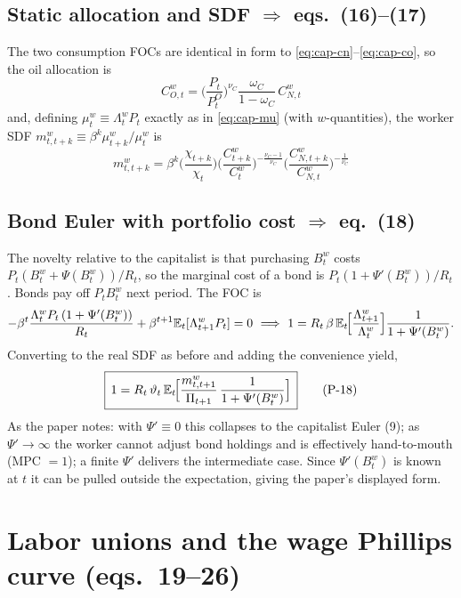 \subsection{Static allocation and SDF \texorpdfstring{$\Rightarrow$}{=>} eqs.\ (16)--(17)}
The two consumption FOCs are identical in form to \eqref{eq:cap-cn}--\eqref{eq:cap-co}, so the oil
allocation is
\begin{equation}\label{eq:17}
\boxed{\,C^w_{O,t}=\Big(\frac{P_t}{P^O_t}\Big)^{\nu_C}\frac{\omega_C}{1-\omega_C}\,C^w_{N,t}\,}
\tag{P-17}
\end{equation}
and, defining $\mu^w_t\equiv\Lambda^w_tP_t$ exactly as in \eqref{eq:cap-mu} (with $w$-quantities), the
worker SDF $m^w_{t,t+k}\equiv\beta^k\mu^w_{t+k}/\mu^w_t$ is
\begin{equation}\label{eq:16}
\boxed{\,m^w_{t,t+k}=\beta^k\Big(\frac{\chi_{t+k}}{\chi_t}\Big)
\Big(\frac{C^w_{t+k}}{C^w_t}\Big)^{-\frac{\nu_C-1}{\nu_C}}
\Big(\frac{C^w_{N,t+k}}{C^w_{N,t}}\Big)^{-\frac1{\nu_C}}\,}\tag{P-16}
\end{equation}

\subsection{Bond Euler with portfolio cost \texorpdfstring{$\Rightarrow$}{=>} eq.\ (18)}
The novelty relative to the capitalist is that purchasing $B^w_t$ costs
$P_t(B^w_t+\Psi(B^w_t))/R_t$, so the marginal cost of a bond is $P_t(1+\Psi'(B^w_t))/R_t$. Bonds pay
off $P_tB^w_t$ next period. The FOC is
\[
-\beta^t\frac{\Lambda^w_tP_t\,(1+\Psi'(B^w_t))}{R_t}+\beta^{t+1}\mathbb{E}_t[\Lambda^w_{t+1}P_t]=0
\ \Longrightarrow\
1=R_t\,\beta\,\mathbb{E}_t\!\Big[\frac{\Lambda^w_{t+1}}{\Lambda^w_t}\Big]\frac{1}{1+\Psi'(B^w_t)} .
\]
Converting to the real SDF as before and adding the convenience yield,
\begin{equation}\label{eq:18}
\boxed{\,1=R_t\,\vartheta_t\,\mathbb{E}_t\!\Big[\frac{m^w_{t,t+1}}{\Pi_{t+1}}\,\frac{1}{1+\Psi'(B^w_t)}\Big]\,}
\tag{P-18}
\end{equation}
As the paper notes: with $\Psi'\equiv0$ this collapses to the capitalist Euler (9); as
$\Psi'\to\infty$ the worker cannot adjust bond holdings and is effectively hand-to-mouth
(MPC $=1$); a finite $\Psi'$ delivers the intermediate case. Since $\Psi'(B^w_t)$ is known at $t$ it
can be pulled outside the expectation, giving the paper's displayed form.

\section{Labor unions and the wage Phillips curve (eqs.\ 19--26)}\label{sec:unions}

